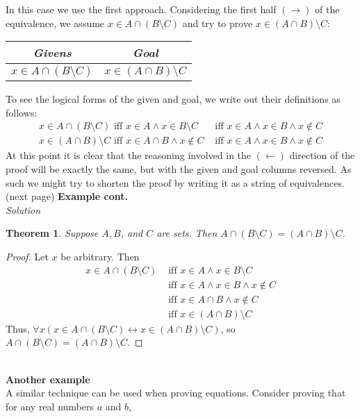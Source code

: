 \documentclass{report}
\newtheorem*{theorem}{Theorem}
\theoremstyle{definition}
\begin{document}
In this case we use the first approach. Considering the first half $(\rightarrow)$ of the equivalence, we assume $x\in A\cap(B\setminus C)$
and try to prove $x\in(A\cap B)\setminus C$:
\begin{center}
\begin{tabular}{c|c}
\textit{Givens}&\textit{Goal}\\
\hline
$x\in A\cap(B\setminus C)$&$x\in(A\cap B)\setminus C$\\
\end{tabular}
\end{center}
To see the logical forms of the given and goal, we write out their definitions as follows:
\begin{align*}
x\in A\cap(B\setminus C)\text{ iff }x\in A\land x\in B\setminus C&\text{ iff }x\in A\land x\in B\land x\notin C\\
x\in(A\cap B)\setminus C\text{ iff }x\in A\cap B\land x\notin C&\text{ iff }x\in A\land x\in B\land x\notin C
\end{align*}
At this point it is clear that the reasoning involved in the $(\leftarrow)$ direction of the proof will be exactly the same, but with the given and goal columns reversed. 
As such we might try to shorten the proof by writing it as a string of equivalences.\\
(next page)\newpage
\noindent\textbf{Example cont.}\\
\textit{Solution}
\begin{theorem}
Suppose $A,B$, and $C$ are sets. Then $A\cap(B\setminus C)=(A\cap B)\setminus C$.
\end{theorem}
\begin{proof}
Let $x$ be arbitrary. Then
\begin{align*}
x\in A\cap(B\setminus C)&\text{ iff }x\in A\land x\in B\setminus C\\
&\text{ iff }x\in A\land x\in B\land x\notin C\\
&\text{ iff }x\in A\cap B\land x\notin C\\
&\text{ iff }x\in(A\cap B)\setminus C
\end{align*}
Thus, $\forall x(x\in A\cap(B\setminus C)\leftrightarrow x\in(A\cap B)\setminus C)$, so $A\cap(B\setminus C)=(A\cap B)\setminus C$.
\end{proof}
\hspace{1mm}\\
\textbf{Another example}\\
A similar technique can be used when proving equations. Consider proving that for any real numbers $a$ and $b$,
\end{document}
